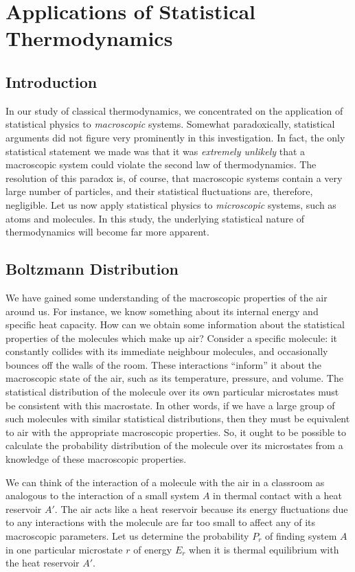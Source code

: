 \chapter{Applications of Statistical Thermodynamics}\label{s7}

\section{Introduction}
In our study
of classical thermodynamics, we concentrated on the application of statistical
physics to {\em macroscopic}\/ systems. Somewhat paradoxically,
statistical arguments did not figure very prominently in this investigation.
In fact, 
the only statistical statement we made  was that it was  {\em
extremely  unlikely}\/ that a macroscopic system could violate the second law of 
thermodynamics. The resolution of this paradox
 is, of course, that macroscopic systems
contain a very large number of particles, and  their statistical fluctuations are,
therefore, 
negligible. Let us now apply statistical physics to {\em microscopic}\/ 
systems,
such as atoms and molecules. In this study, the underlying statistical nature
of thermodynamics will become far more apparent. 

\section{Boltzmann Distribution}\label{s7.2}
We have gained some understanding of the macroscopic properties of the
air around us. For instance, we know
something about its internal energy and specific heat capacity. 
How can we obtain some information about the
 statistical properties of the molecules which make
up air? Consider a specific molecule: it constantly collides with
its immediate neighbour molecules,
   and occasionally bounces off the walls of the room. These
interactions ``inform'' it about the macroscopic state of the air,
 such as its temperature, pressure, and volume. The
statistical distribution of the molecule over its own particular microstates must
be consistent with this macrostate. In other words, if we have a large group
of such molecules with  similar statistical distributions,
then they must be equivalent to
air with the appropriate macroscopic properties. So, it ought to be possible
to calculate the probability distribution of the molecule over its microstates
from a knowledge of these macroscopic properties.

We can think of the interaction of a molecule with the 
air in a classroom as
analogous to the interaction of a small system $A$ in thermal contact with a
heat reservoir $A'$. The air acts like a heat reservoir  because its energy
fluctuations  due to any interactions
 with the molecule are far too small to affect any
of its macroscopic parameters.   Let us 
determine  the probability $P_r$ of finding  system $A$ in one particular
microstate $r$ of energy $E_r$ when it is thermal equilibrium with the heat
reservoir $A'$. 

